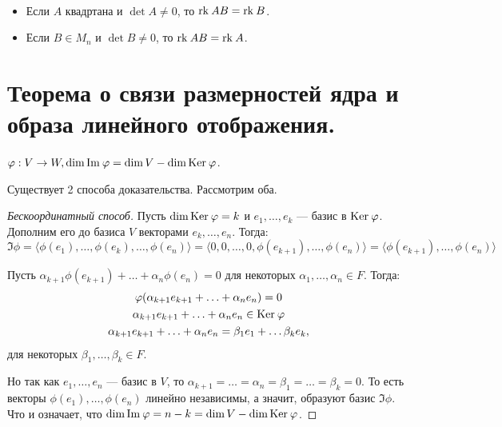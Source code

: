 \begin{Task}\
    \begin{itemize}
        \item Если $A$ квадртана и $\det A \neq 0$, то $\mathrm{rk}\: AB = \mathrm{rk}\: B$.
        \item Если $B \in M_n$ и $\det B \neq 0$, то $\mathrm{rk}\: AB = \mathrm{rk}\: A$.
    \end{itemize}
\end{Task}

\section{Теорема о связи размерностей ядра и образа линейного отображения.}

\begin{Theorem}
    $\varphi:V \rightarrow W, \dim \mathrm{Im\:} \varphi = \dim V - \dim \mathrm{Ker}\: \varphi$.
\end{Theorem}

Существует 2 способа доказательства. Рассмотрим оба.

\begin{proof}[Бескоординатный способ]
     Пусть $\dim \mathrm{Ker}\: \varphi = k$ и $e_1, \ldots, e_k$ --- базис в $\mathrm{Ker}\: \varphi$. Дополним его до базиса $V$ векторами $e_k, \ldots, e_n$. Тогда:
    \[
        \Im \phi = \langle\phi(e_1), \ldots, \phi(e_k), \ldots, \phi(e_n)\rangle = \langle0, 0, \ldots, 0, \phi(e_{k+1}), \ldots, \phi(e_n)\rangle = \langle\phi(e_{k+1}), \ldots, \phi(e_{n})\rangle
    \]
    
Пусть $\alpha_{k+1}\phi(e_{k+1}) + \ldots + \alpha_n\phi(e_n) = 0$ для некоторых $\alpha_1, \ldots, \alpha_n \in F$. Тогда:
\begin{gather*}
    \varphi(\alpha_{k+1}e_{k+1} + \ldots + \alpha_ne_n) = 0 \\
    \alpha_{k+1}e_{k+1} + \ldots + \alpha_ne_n \in \mathrm{Ker}\: \varphi \\
    \alpha_{k+1}e_{k+1} + \ldots + \alpha_ne_n = \beta_1e_1 + \ldots \beta_ke_k,
\end{gather*}
для некоторых $\beta_1, \ldots, \beta_k \in F$.

Но так как $e_1, \ldots, e_n$ --- базис в $V$, то $\alpha_{k+1} =  \ldots = \alpha_n = \beta_1 = \ldots = \beta_k = 0$. То есть векторы $\phi(e_1), \ldots, \phi(e_n)$ линейно независимы, а значит, образуют базис $\Im \phi$. Что и означает, что $\dim\mathrm{Im\:}\varphi = n - k = \dim V - \dim\mathrm{Ker}\:\varphi$.
\end{proof}

